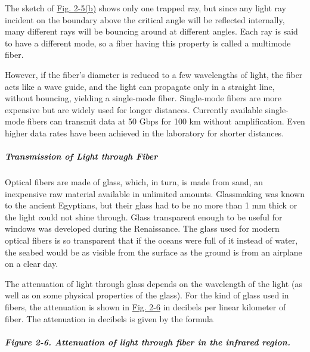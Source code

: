 
The sketch of
\protect\hyperlink{0130661023_ch02lev1sec2.htmlux5cux23ch02fig05}{Fig.
2-5(b)} shows only one trapped ray, but since any light ray incident on
the boundary above the critical angle will be reflected internally, many
different rays will be bouncing around at different angles. Each ray is
said to have a different {mode}, so a fiber having this property is
called a {multimode fiber}.

However, if the fiber's diameter is reduced to a few wavelengths of
light, the fiber acts like a wave guide, and the light can propagate
only in a straight line, without bouncing, yielding a {single-mode
fiber}. Single-mode fibers are more expensive but are widely used for
longer distances. Currently available single-mode fibers can transmit
data at 50 Gbps for 100 km without amplification. Even higher data rates
have been achieved in the laboratory for shorter distances.

\protect\hypertarget{0130661023_ch02lev1sec2.htmlux5cux23ch02lev3sec1}{}{}

\subparagraph{Transmission of Light through Fiber}

Optical fibers are made of glass, which, in turn, is made from sand, an
inexpensive raw material available in unlimited amounts. Glassmaking was
known to the ancient Egyptians, but their glass had to be no more than 1
mm thick or the light could not shine through. Glass transparent enough
to be useful for windows was developed during the Renaissance. The glass
used for modern optical fibers is so transparent that if the oceans were
full of it instead of water, the seabed would be as visible from the
surface as the ground is from an airplane on a clear day.

The attenuation of light through glass depends on the wavelength of the
light (as well as on some physical properties of the glass). For the
kind of glass used in fibers, the attenuation is shown in
\protect\hyperlink{0130661023_ch02lev1sec2.htmlux5cux23ch02fig06}{Fig.
2-6} in decibels per linear kilometer of fiber. The attenuation in
decibels is given by the formula

\subparagraph[Figure 2-6. Attenuation of light through fiber in the
infrared
region.]{\texorpdfstring{\protect\hypertarget{0130661023_ch02lev1sec2.htmlux5cux23ch02fig06}{}{}Figure
2-6. Attenuation of light through fiber in the infrared
region.}{Figure 2-6. Attenuation of light through fiber in the infrared region.}}

